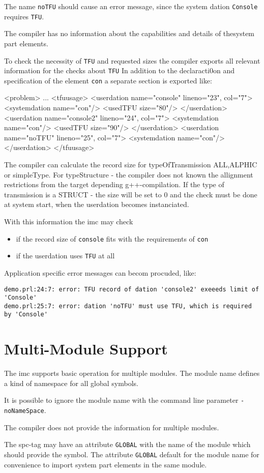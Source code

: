 The name \texttt{noTFU} should cause an error message,
since the system dation \texttt{Console} requires \texttt{TFU}.

The compiler  has no information about the capabilities and details
of thesystem part elements.

To check the necessity of \texttt{TFU} and requested sizes the compiler 
exports all relevant information for the checks about \texttt{TFU}
In addition to the declaracti0on and specification of the element \texttt{con}
a separate section is exported like:

\begin{XMLCode}
 <problem>
  ...
  <tfuusage>
    <userdation name="console" lineno="23", col="7">
       <systemdation name="con"/>
       <usedTFU size="80"/>
    </userdation>
    <userdation name="console2" lineno="24", col="7">
       <systemdation name="con"/>
       <usedTFU size="90"/>
    </userdation>
    <userdation name="noTFU" lineno="25", col="7">
       <systemdation name="con"/>
    </userdation>
  </tfuusage>
\end{XMLCode}

The compiler can calculate the record size for typeOfTransmission ALL,ALPHIC or simpleType. For typeStructure - the compiler does not known the allignment
restrictions from the target depending g++-compilation.
If the type of transmission is a STRUCT - the size will be set to 0
and the check must be done at system start,
when the userdation becomes instanciated.

With this information the imc may check
\begin{itemize}
\item if the record size  of \texttt{console} fits with the requirements of 
    \texttt{con}
\item if the userdation uses \texttt{TFU} at all
\end{itemize} 

Application specific error messages can becom procuded, like:

\lstset{breaklines=true}
\begin{lstlisting}
demo.prl:24:7: error: TFU record of dation 'console2' exeeeds limit of 'Console'
demo.prl:25:7: error: dation 'noTFU' must use TFU, which is required by 'Console'
\end{lstlisting}


\section{Multi-Module Support}
The imc supports basic operation for multiple modules.
The module name defines a kind of namespace for all global symbols.

It is possible to ignore the module name with the command line parameter 
\texttt{-noNameSpace}.

The compiler does not provide the information for multiple modules.

The spc-tag may have an attribute \texttt{GLOBAL} with the name of
the module which should provide the symbol. The attribute \texttt{GLOBAL} 
default for the module name for convenience to import system part elements
in the same module.

